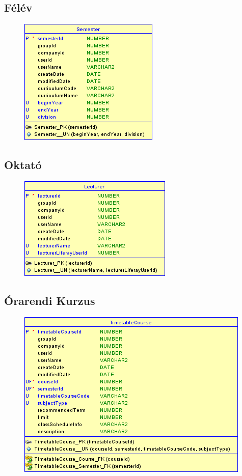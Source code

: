 \documentclass[hidelinks, 12pt, a4paper]{report}
\begin{document}
\subsection{Félév}

\begin{figure}[H]
    \centering
	\includegraphics{semester.png}
\end{figure}

\subsection{Oktató}

\begin{figure}[H]
    \centering
	\includegraphics{lecturer.png}
\end{figure}

\subsection{Órarendi Kurzus}

\begin{figure}[H]
    \centering
	\includegraphics{timetable_course.png}
\end{figure}
\end{document}
